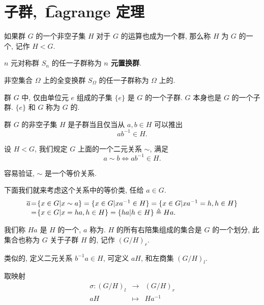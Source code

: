 \section{子群,\ \t{Lagrange} 定理}

\begin{definition}
	如果群 $G$ 的一个非空子集 $H$ 对于 $G$ 的运算也成为一个群, 那么称 $H$ 为 $G$ 的一个, 记作 $H<G$.

	$n$ 元对称群 $S_n$ 的任一子群称为 \textbf{$n$ 元置换群}.

	非空集合 $\Omega$ 上的全变换群 $S_\Omega$ 的任一子群称为 $\Omega$ 上的.

	群 $G$ 中, 仅由单位元 $e$ 组成的子集 $\{e\}$ 是 $G$ 的一个子群. $G$ 本身也是 $G$ 的一个子群. $\{e\}$ 和 $G$ 称为 $G$ 的.
\end{definition}

\begin{proposition}
	群 $G$ 的非空子集 $H$ 是子群当且仅当从 $a,b\in H$ 可以推出 $$ab^{-1}\in H.$$
\end{proposition}

\begin{definition}
	设 $H<G$, 我们规定 $G$ 上面的一个二元关系 $\sim$, 满足 $$a\sim b\Leftrightarrow ab^{-1}\in H.$$
\end{definition}

容易验证, $\sim$ 是一个等价关系.

下面我们就来考虑这个关系中的等价类, 任给 $a\in G$.
\begin{equation*}
\setlength{\arraycolsep}{0.5pt}
\begin{array}{rcl}
	\overline{a}&=&\{x\in G|x\sim a\}=\{x\in G|xa^{-1}\in H\}=\{x\in G|xa^{-1}=h,h\in H\}\\
	&=&\{x\in G|x=ha,h\in H\}=\{ha|h\in H\}\triangleq Ha.
\end{array}
\end{equation*}

\begin{definition}
	我们称 $Ha$ 是 $H$ 的一个, $a$ 称为. $H$ 的所有右陪集组成的集合是 $G$ 的一个划分, 此集合也称为 $G$ 关于子群 $H$ 的, 记作 $(G/H)_r$.
\end{definition}

类似的, 定义二元关系 $b^{-1}a\in H$, 可定义 $aH$, 和左商集 $(G/H)_l$.

取映射 $$\begin{array}{rcl}
	\sigma:(G/H)_l &\to& (G/H)_r \\
	aH & \mapsto & Ha^{-1}
\end{array}$$

